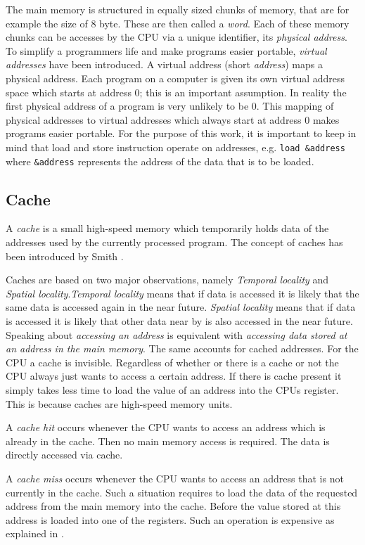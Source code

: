 \documentclass[onecolumn, openright, master, english, signatures]{dbrgrptt}
\begin{document}
The main memory is structured in equally sized chunks of memory, that are for example the size of 8 byte. These are then called a \emph{word}. Each of these memory chunks can be accesses by the \ac{CPU} via a unique identifier, its \emph{physical address}. To simplify a programmers life and make programs easier portable, \emph{virtual addresses} have been introduced. A virtual address (short \emph{address}) maps a physical address. Each program on a computer is given its own virtual address space which starts at address 0; this is an important assumption. In reality the first physical address of a program is very unlikely to be 0. This mapping of physical addresses to virtual addresses which always start at address 0 makes programs easier portable. For the purpose of this work, it is important to keep in mind that load and store instruction operate on addresses, e.g. \texttt{load \&address} where \texttt{\&address} represents the address of the data that is to be loaded.

\subsection{Cache}
A \emph{cache} is a small high-speed memory which temporarily holds data of the addresses used by the currently processed program. The concept of caches has been introduced by Smith \cite{smith1982cache}.

Caches are based on two major observations, namely \emph{Temporal locality} and \emph{Spatial locality}.\emph{Temporal locality} means that if data is accessed it is likely that the same data is accessed again in the near future. \emph{Spatial locality} means that if data is accessed it is likely that other data near by is also accessed in the near future. Speaking about \emph{accessing an address} is equivalent with \emph{accessing data stored at an address in the main memory}. The same accounts for cached addresses. For the \ac{CPU} a cache is invisible. Regardless of whether or there is a cache or not the \ac{CPU} always just wants to access a certain address. If there is cache present it simply takes less time to load the value of an address into the \ac{CPU}s register. This is because caches are high-speed memory units.

A \emph{cache hit} occurs whenever the \ac{CPU} wants to access an address which is already in the cache. Then no main memory access is required. The data is directly accessed via cache.

A \emph{cache miss} occurs whenever the \ac{CPU} wants to access an address that is not currently in the cache. Such a situation requires to load the data of the requested address from the main memory into the cache. Before the value stored at this address is loaded into one of the registers. Such an operation is expensive as explained in .
\end{document}
